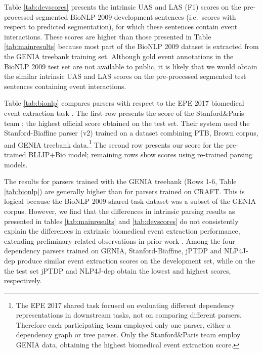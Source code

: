 \documentclass[twocolumn,hyperref]{bmcart}\pdfoutput=1
\begin{document}
 Table \ref{tab:devscores} presents the intrinsic UAS and LAS (F1) scores on the  pre-processed  segmented BioNLP 2009 development sentences (i.e.\ scores with respect to  predicted segmentation), for which these sentences contain event interactions.  These scores are higher than those presented in Table \ref{tab:mainresults} because most part of the BioNLP 2009 dataset is extracted from  the GENIA treebank training set. 
 Although gold event annotations  in the BioNLP 2009 test set are not available to public, it is likely that we would obtain the similar intrinsic UAS and LAS scores on the pre-processed  segmented test  sentences containing event interactions. 
 


Table \ref{tab:bionlp} compares parsers with respect to the EPE 2017 biomedical event extraction task   \cite{epe2017bio}. The first row presents the score of the Stanford\&Paris  team  \cite{stanfordparis2017}; the highest official score obtained on the test set.  
Their system  
used the  Stanford-Biaffine parser (v2) trained on a dataset  combining  
PTB, Brown corpus, and GENIA treebank data.\footnote{The EPE 2017  shared task \cite{epe2017} focused on evaluating different dependency representations in downstream tasks, not on comparing different parsers. Therefore each participating team  employed only one parser, either a dependency graph or tree parser.  Only the  Stanford\&Paris team \cite{stanfordparis2017} employ GENIA data, obtaining the highest biomedical event extraction score.}  
 The second row presents our score for the pre-trained BLLIP+Bio model;  
  remaining rows show scores using re-trained parsing models. 
 
 

 

The results for parsers trained with the GENIA treebank (Rows 1-6, Table \ref{tab:bionlp}) are generally higher than for parsers trained on CRAFT. This is logical because the BioNLP 2009 shared task dataset was a subset of  the GENIA corpus.
However, we find that the differences in intrinsic parsing results  as presented in tables \ref{tab:mainresults} and \ref{tab:devscores} do not consistently explain the differences in extrinsic biomedical event extraction performance, extending preliminary related observations in prior work \cite{nguyen-verspoor:2018:K18-2,mackinlay2013extracting}. Among the four dependency parsers trained on GENIA,  Stanford-Biaffine, jPTDP and NLP4J-dep produce similar event extraction scores on the  development set, while  on the the test set jPTDP and NLP4J-dep obtain  the lowest  and  highest scores, respectively. 
\end{document}
